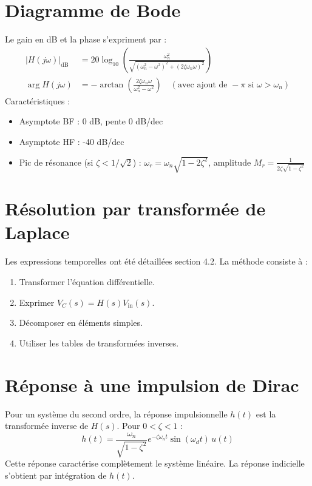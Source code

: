 \documentclass[12pt,a4paper]{article}
\begin{document}
	\section{Diagramme de Bode}
	Le gain en dB et la phase s'expriment par :
	\begin{align}
	|H(j\omega)|_{\text{dB}} &= 20\log_{10}\left( \frac{\omega_n^2}{\sqrt{(\omega_n^2-\omega^2)^2 + (2\zeta\omega_n\omega)^2}} \right) \\
	\arg H(j\omega) &= -\arctan\left( \frac{2\zeta\omega_n\omega}{\omega_n^2-\omega^2} \right) \quad (\text{avec ajout de }-\pi \text{ si } \omega>\omega_n)
	\end{align}
	Caractéristiques :
	\begin{itemize}
		\item Asymptote BF : 0 dB, pente 0 dB/dec
		\item Asymptote HF : -40 dB/dec
		\item Pic de résonance (si $\zeta<1/\sqrt{2}$) : $\omega_r = \omega_n\sqrt{1-2\zeta^2}$, amplitude $M_r = \frac{1}{2\zeta\sqrt{1-\zeta^2}}$
	\end{itemize}
	
	\section{Résolution par transformée de Laplace}
	Les expressions temporelles ont été détaillées section 4.2. La méthode consiste à :
	\begin{enumerate}
		\item Transformer l'équation différentielle.
		\item Exprimer $V_C(s) = H(s) V_{\text{in}}(s)$.
		\item Décomposer en éléments simples.
		\item Utiliser les tables de transformées inverses.
	\end{enumerate}
	
	\newpage
	\section{Réponse à une impulsion de Dirac}
	Pour un système du second ordre, la réponse impulsionnelle $h(t)$ est la transformée inverse de $H(s)$. Pour $0<\zeta<1$ :
	\begin{equation}
	h(t) = \frac{\omega_n}{\sqrt{1-\zeta^2}} e^{-\zeta\omega_n t} \sin(\omega_d t) \, u(t)
	\end{equation}
	Cette réponse caractérise complètement le système linéaire. La réponse indicielle s'obtient par intégration de $h(t)$.
	
\end{document}
